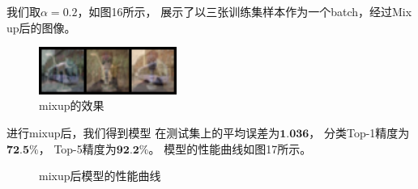 \documentclass[UTF8]{ctexart}
\begin{document}
我们取$\alpha=0.2$，如图16所示，
展示了以三张训练集样本作为一个batch，经过Mix up后的图像。

\begin{figure}[h]
    \centering
    \includegraphics[width=0.40\textwidth]{../img/sample_mixup.png}
    \caption{mixup的效果}
\end{figure}

进行mixup后，我们得到模型
在测试集上的平均误差为$\textbf{1.036}$，
分类Top-1精度为$\textbf{72.5\%}$，
Top-5精度为$\textbf{92.2\%}$。
模型的性能曲线如图17所示。

\begin{figure}[htbp]
    \centering
    \hspace{0.5in}
    \hspace{0.5in}
    \caption{mixup后模型的性能曲线}
\end{figure}
\end{document}
